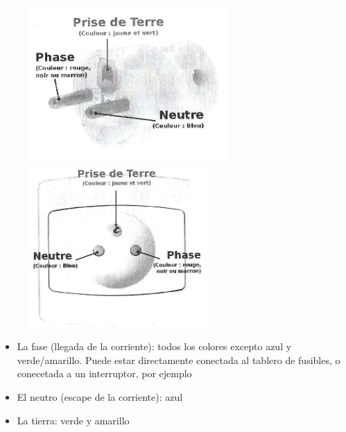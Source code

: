 \documentclass[a5paper,twoside,openany]{book}
\begin{document}
\begin{enumerate}
\begin{figure}[h]
    \centering
    \begin{minipage}[b]{0.45\textwidth}
        \centering
        \includegraphics[width=\textwidth]{enchufe-macho} 
    \end{minipage}
    \hfill
    \begin{minipage}[b]{0.45\textwidth}
        \centering
        \includegraphics[width=\textwidth]{enchufe-hembra} 
    \end{minipage}
\end{figure}

\begin{itemize}
\item La fase (llegada de la corriente): todos los colores excepto azul y verde/amarillo. Puede estar directamente conectada al tablero de fusibles, o conecetada a un interruptor, por ejemplo
\item El neutro (escape de la corriente): azul
\item La tierra: verde y amarillo
\end{itemize}

\end{enumerate}
\end{document}
